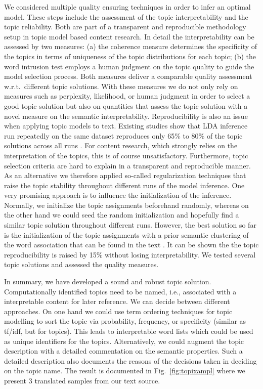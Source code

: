 \documentclass[a4paper,10pt]{article}
\newcommand{\PFS}[1]{\begingroup\color{blue}#1\endgroup}
\begin{document}
We considered multiple quality ensuring techniques in order to infer an
optimal model. These steps include the assessment of the topic
interpretability and the topic reliability. Both are part of a transparent
and reproducible methodology setup in topic model based content research.
In detail the interpretability can be assessed by two measures: (a) the
coherence measure \cite{newman:2010} determines the specificity of the
topics in terms of uniqueness of the topic distributions for each topic;
(b) the word intrusion test \cite{chang:2009} employs a human judgment on
the topic quality to guide the model selection process. Both measures
deliver a comparable quality assessment w.r.t.\ different topic
solutions. With these measures we do not only rely on measures such as
perplexity, likelihood, or human judgment in order to select a good topic
solution but also on quantities that assess the topic solution with a novel
measure on the semantic interpretability. Reproducibility is also an issue
when applying topic models to text. Existing studies show that LDA
inference run repeatedly on the same dataset reproduces only 65\% to 80\%
of the topic solutions across all runs \cite{niekler:2012,koltcov:2016}.
For content research, which strongly relies on the interpretation of the
topics, this is of course unsatisfactory. Furthermore, topic selection
criteria are hard to explain in a transparent and reproducible manner. As
an alternative we therefore applied so-called regularization techniques
that raise the topic stability throughout different runs of the model
inference. One very promising approach is to influence the initialization
of the inference. Normally, we initialize the topic assignments beforehand
randomly, whereas on the other hand we could seed the random initialization
and hopefully find a similar topic solution throughout different
runs. However, the best solution so far is the initialization of the topic
assignments with a prior semantic clustering of the word association that
can be found in the text \cite{lancichinetti:2015}. It can be shown the the
topic reproducibility is raised by 15\% without losing interpretability. We
tested several topic solutions and assessed the quality measures.

\PFS{In summary, we have developed a sound and robust topic solution.
  Computationally identified topics need to be named, i.e., associated with
  a interpretable content for later reference.}  We can decide between
different approaches. On one hand we could use term ordering techniques for
topic modelling to sort the topic via probability, frequency, or
specificity (similar as tf/idf, but for topics). This leads to
interpretable word lists which could be used as unique identifiers for the
topics. Alternatively, we could augment the topic description with a
detailed commentation on the semantic properties. \PFS{Such a detailed
  description also documents the reasons of the decisions taken in deciding
  on the topic name.} The result is documented in Fig.~\ref{fig:topixampl}
where we present 3 translated samples from our text source.
\end{document}
